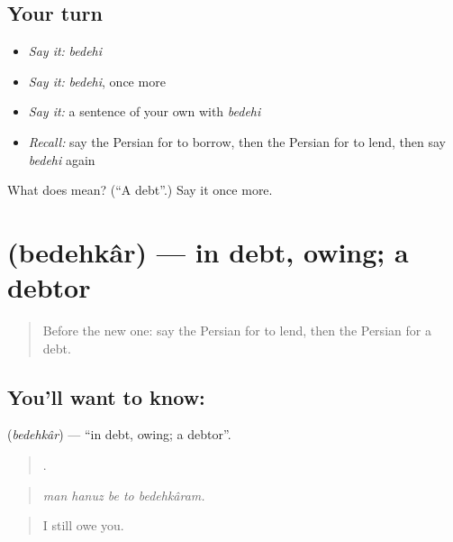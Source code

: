 \subsection*{Your turn}
\begin{itemize}
\raggedright
  \item \emph{Say it:} \emph{bedehi}
  \item \emph{Say it:} \emph{bedehi}, once more
  \item \emph{Say it:} a sentence of your own with \emph{bedehi}
  \item \emph{Recall:} say the Persian for to borrow, then the Persian for to lend, then say \emph{bedehi} again
\end{itemize}

\begin{tcolorbox}[breakable,colback=teal!4,colframe=teal!35!black,title={Before you move on}]
What does  mean? (\textquotedblleft{}A debt\textquotedblright{}.) Say it once more.
\end{tcolorbox}
\section[\texorpdfstring{\fa{بدهکار} (bedehkâr)}{بدهکار (bedehkâr)}]{ (bedehkâr) — in debt, owing; a debtor}

\label{lesson:FA-C411-bedehkar}



\begin{quote}
Before the new one: say the Persian for to lend, then the Persian for a debt.
\end{quote}

\subsection*{You'll want to know: }
\textbf{} (\emph{bedehkâr}) — \textquotedblleft{}in debt, owing; a debtor\textquotedblright{}.

\begin{quote}
    .
\end{quote}

\begin{quote}
\emph{man hanuz be to bedehkâram.}
\end{quote}

\begin{quote}
I still owe you.
\end{quote}

